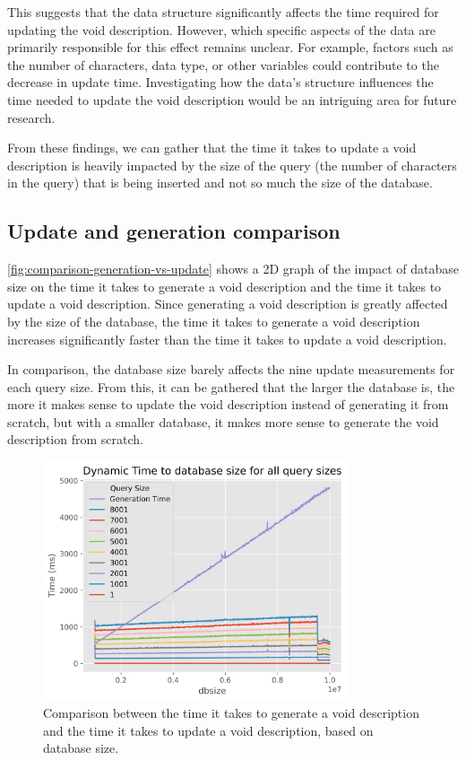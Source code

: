 This suggests that the data structure significantly affects the time required for updating the \gls{void} description. However, which specific aspects of the data are primarily responsible for this effect remains unclear. For example, factors such as the number of characters, data type, or other variables could contribute to the decrease in update time. Investigating how the data's structure influences the time needed to update the \gls{void} description would be an intriguing area for future research.

From these findings, we can gather that the time it takes to update a \gls{void} description is heavily impacted by the size of the query (the number of characters in the query) that is being inserted and not so much the size of the database.


\subsection{Update and generation comparison}\label{subsec:update-generation-comparison}
\autoref{fig:comparison-generation-vs-update} shows a 2D graph of the impact of database size on the time it takes to generate a \gls{void} description and the time it takes to update a \gls{void} description. Since generating a \gls{void} description is greatly affected by the size of the database, the time it takes to generate a \gls{void} description increases significantly faster than the time it takes to update a \gls{void} description.

In comparison, the database size barely affects the nine update measurements for each query size. From this, it can be gathered that the larger the database is, the more it makes sense to update the \gls{void} description instead of generating it from scratch, but with a smaller database, it makes more sense to generate the \gls{void} description from scratch.

\begin{figure}[t]
    \centering
    \includegraphics[width=0.8\textwidth]{figures/comparison-Generation-vs-Update.png}
    \caption{Comparison between the time it takes to generate a \gls{void} description and the time it takes to update a \gls{void} description, based on database size.}
    \label{fig:comparison-generation-vs-update}
\end{figure}


